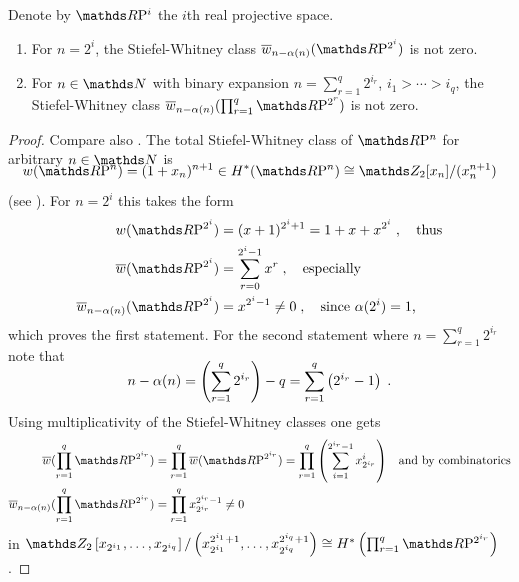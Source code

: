 \begin{Thm}
  Denote by $\RP{i}$ the $i$th real projective space.
  \begin{enumerate}
  \item For $n=2^i$, the Stiefel-Whitney class
    $\dualw{n-\alpha(n)}{\RP{2^i}}$ is not zero.
  \item For $n\in\Nat$ with binary expansion
    $n=\sum_{r=1}^{q}2^{i_r}$, $i_1>\dotsb>i_q$, the Stiefel-Whitney class
    $\dualw{n-\alpha(n)}{\prod_{r=1}^{q}\RP{2^r}}$ is not zero.
  \end{enumerate}
  \begin{proof}
    Compare also \cite[p.~87]{immersionconj}.
    The total Stiefel-Whitney class of $\RP{n}$ for arbitrary
    $n\in\Nat$ is
    \begin{gather*}
      \SwapAboveDisplaySkip
      \W{\RP n} = (1+x_n)^{n+1}\in\H^*(\RP n)\cong \Zmod2[x_n]/(x_n^{n+1})
    \end{gather*}
    (see \forexample \cite[Example~(19.4.1)]{tomdieck}).
    For $n=2^i$ this takes the form
    \begin{align*}
      \W{\RP{2^i}}
      &= (x+1)^{2^i+1}
      = 1 + x + x^{2^i}
        \;,\quad\text{thus} \\
      \dualW{\RP{2^i}}
      &= \sum_{r=0}^{2^i-1} x^r
        \;,\quad\text{especially} \\
      \dualw{n-\alpha(n)}{\RP{2^i}}
      &= x^{2^i-1}\neq 0
        \;,\quad\text{since $\alpha(2^i)=1$,}
    \end{align*}
    which proves the first statement.
    For the second statement where $n=\sum_{r=1}^q 2^{i_r}$ note that
    \begin{gather}
      \SwapAboveDisplaySkip
      \label{eq:bestresultproof1}
      n-\alpha(n)
      = \left( \sum_{r=1}^q 2^{i_r} \right) - q
      = \sum_{r=1}^q \left( 2^{i_r} - 1 \right)
      \;.
    \end{gather}
    Using multiplicativity %
    of the Stiefel-Whitney classes one gets
    \begin{align*}
      \dualW{\prod_{r=1}^q \RP{2^{i_r}}}
      &= \prod_{r=1}^q \dualW{\RP{2^{i_r}}}
        = \prod_{r=1}^q \left(\sum_{i=1}^{2^{i_r}-1} x_{2^{i_r}}^{i}\right)
        &\text{and by combinatorics} \\
      \dualw{n-\alpha(n)}{\prod_{r=1}^{q}\RP{2^{i_r}}}
      &= \prod_{r=1}^q x_{2^{i_r}}^{2^{i_r}-1}
        \neq 0
    \end{align*}
    in
    $\Zmod2\left[x_{2^{i_1}},\dotsc,x_{2^{i_q}}\right]/
    \left(x_{2^{i_1}}^{2^{i_1}+1},\dotsc,x_{2^{i_q}}^{2^{i_q}+1}\right)
    \cong \H^*\left(\prod_{r=1}^q \RP{2^{i_r}}\right)$.
  \end{proof}
\end{Thm}


